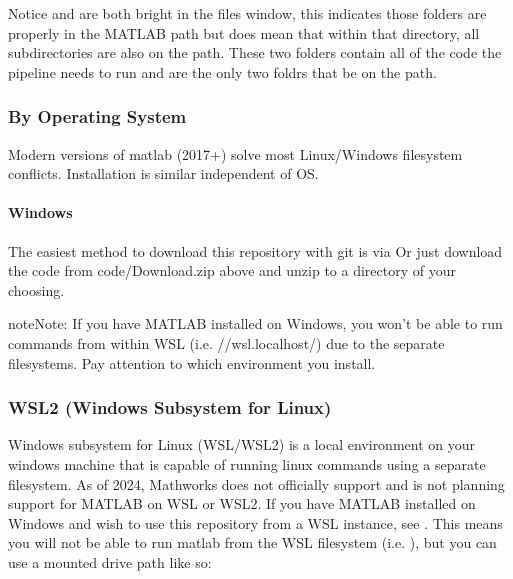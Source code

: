 \documentclass[letterpaper,10pt,english]{sphinxmanual}
\let\sphinxpxdimen\pdfpxdimen\else\newdimen\sphinxpxdimen
\begin{document}
\noindent\sphinxincludegraphics[width=200\sphinxpxdimen]{{matlab_path_explorer}.png}

\sphinxAtStartPar
Notice  and  are both bright in the files window, this indicates those folders are properly in the MATLAB path but does  mean that within that directory, all subdirectories are also on the path. These two folders contain all of the code the pipeline needs to run and are the only two foldrs that  be on the path.


\subsubsection{By Operating System}
\label{\detokenize{get_started/install:by-operating-system}}
\sphinxAtStartPar
Modern versions of matlab (2017+) solve most Linux/Windows filesystem conflicts. Installation is similar independent of OS.


\paragraph{Windows}
\label{\detokenize{get_started/install:windows}}
\sphinxAtStartPar
The easiest method to download this repository with git is via 
Or just download the code from code/Download.zip above and unzip to a directory of your choosing.

\begin{sphinxadmonition}{note}{Note:}
\sphinxAtStartPar
If you have MATLAB installed on Windows, you won’t be able to run commands from within WSL (i.e. //wsl.localhost/)
due to the separate filesystems. Pay attention to which environment you install.
\end{sphinxadmonition}


\subsubsection{WSL2 (Windows Subsystem for Linux)}
\label{\detokenize{get_started/install:wsl2-windows-subsystem-for-linux}}
\sphinxAtStartPar
Windows subsystem for Linux (WSL/WSL2) is a local environment on your windows machine that is capable of running linux commands using a separate filesystem. As of 2024, Mathworks does not officially support and is not planning support for MATLAB on WSL or WSL2.
If you have MATLAB installed on Windows and wish to use this repository from a WSL instance, see .
This means you will not be able to run matlab from the WSL filesystem (i.e. ), but you can use a mounted  drive path like so:
\end{document}
